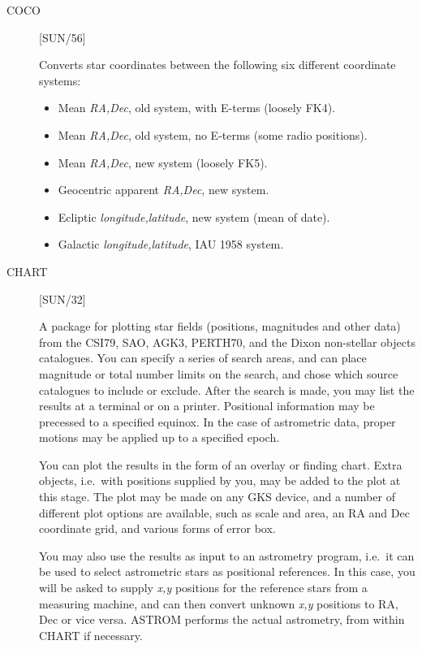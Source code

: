 \begin{description}

\item [COCO] \hfill [SUN/56]

Converts star coordinates between the following six different coordinate
systems:
\begin{itemize}
\item Mean {\em RA,Dec}, old system, with E-terms (loosely FK4).
\item Mean {\em RA,Dec}, old system, no E-terms (some radio positions).
\item Mean {\em RA,Dec}, new system (loosely FK5).
\item Geocentric apparent {\em RA,Dec}, new system.
\item Ecliptic {\em longitude,latitude}, new system (mean of date).
\item Galactic {\em longitude,latitude}, IAU 1958 system.
\end{itemize}

\item [CHART] \hfill [SUN/32]

A package for plotting star fields (positions, magnitudes and other
data) from the CSI79, SAO, AGK3, PERTH70, and the Dixon non-stellar objects
catalogues.
You can specify a series of search areas, and can place magnitude or total
number limits on the search, and chose which source catalogues to include
or exclude.
After the search is made, you may list the results at a terminal or on a
printer.
Positional information may be precessed to a specified equinox.
In the case of astrometric data, proper motions may be applied up to a specified
epoch.

You can plot the results in the form of an overlay or finding chart.
Extra objects, i.e.\ with positions supplied by you, may be added to the plot at
this stage.
The plot may be made on any GKS device, and a number of different plot options
are available, such as scale and area, an RA and Dec coordinate grid, and
various forms of error box.

You may also use the results as input to an astrometry program, i.e.\ it can
be used to select astrometric stars as positional references.
In this case, you will be asked to supply {\em x,y} positions for the reference
stars from a measuring machine, and can then convert unknown {\em x,y} positions
to RA, Dec or vice versa.
ASTROM performs the actual astrometry, from within CHART if necessary.


\end{description}
